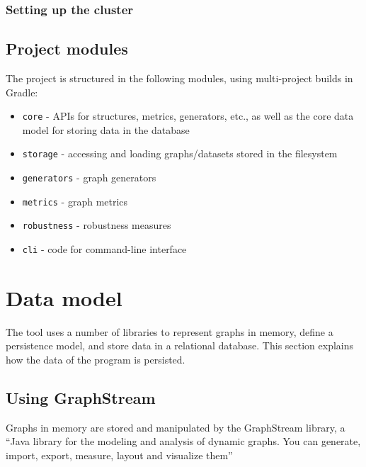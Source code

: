 \subsubsection{Setting up the cluster}



\subsection{Project modules}

The project is structured in the following modules, using multi-project builds in Gradle:
\begin{itemize}
    \item \texttt{core} - APIs for structures, metrics, generators, etc., as well as the core data model for storing data in the database
    \item \texttt{storage} - accessing and loading graphs/datasets stored in the filesystem
    \item \texttt{generators} - graph generators
    \item \texttt{metrics} - graph metrics
    \item \texttt{robustness} - robustness measures
    \item \texttt{cli} - code for command-line interface
\end{itemize}



\section{Data model}

The \graffs tool uses a number of libraries to represent graphs in memory, define a persistence model, and store data in a relational database.
This section explains how the data of the program is persisted.

\subsection{Using GraphStream}

Graphs in memory are stored and manipulated by the GraphStream library\cite{DutotGraphStreamToolBridging2007}, a \enquote{Java library for the modeling and analysis of dynamic graphs. You can generate, import, export, measure, layout and visualize them}



